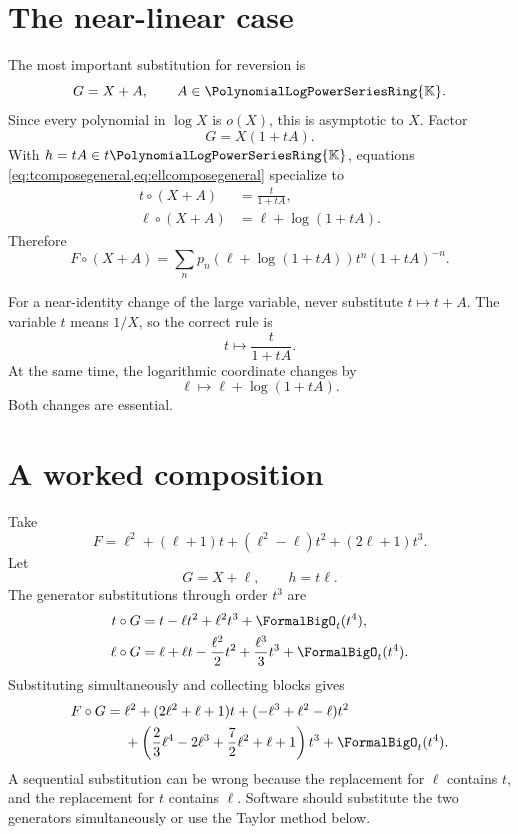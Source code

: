 \documentclass[11pt,oneside,openany]{book}
\newcommand{\K}{\mathbb{K}}
\newcommand{\Rring}{\PolynomialLogPowerSeriesRing{\K}}
\newcommand{\compose}{\mathbin{\circ}}
\begin{document}
\section{The near-linear case}
The most important substitution for reversion is
\begin{equation}\label{eq:nearlinearG}
  G=X+A,
  \qquad A\in\Rring.
\end{equation}
Since every polynomial in \(\log X\) is \(o(X)\), this is asymptotic to \(X\).
Factor
\[
 G=X(1+tA).
\]
With \(h=tA\in t\Rring\), equations
\cref{eq:tcomposegeneral,eq:ellcomposegeneral} specialize to
\begin{align}
 t\compose(X+A)&=\frac{t}{1+tA},
 \label{eq:tcomposeshift}\\
 \ell\compose(X+A)&=\ell+\log(1+tA).
 \label{eq:ellcomposeshift}
\end{align}
Therefore
\begin{equation}\label{eq:shiftcompositionexplicit}
 F\compose(X+A)
 =\sum_n p_n\!\left(\ell+\log(1+tA)\right)
   t^n(1+tA)^{-n}.
\end{equation}

\begin{keybox}
For a near-identity change of the large variable, never substitute
\(t\mapsto t+A\).  The variable \(t\) means \(1/X\), so the correct rule is
\[
  t\mapsto\frac{t}{1+tA}.
\]
At the same time, the logarithmic coordinate changes by
\[
  \ell\mapsto\ell+\log(1+tA).
\]
Both changes are essential.
\end{keybox}

\section{A worked composition}
Take
\begin{equation}\label{eq:Fcompositionexample}
 F=\ell^2+(\ell+1)t+(\ell^2-\ell)t^2+(2\ell+1)t^3.
\end{equation}
Let
\[
 G=X+\ell,
 \qquad h=t\ell.
\]
The generator substitutions through order \(t^3\) are
\begin{align*}
 t\compose G
 &=t-\ell t^2+\ell^2t^3+\FormalBigO_t(t^4),\\
 \ell\compose G
 &=\ell+\ell t-\frac{\ell^2}{2}t^2
   +\frac{\ell^3}{3}t^3+\FormalBigO_t(t^4).
\end{align*}
Substituting simultaneously and collecting blocks gives
\begin{align}\label{eq:compositionworked}
 F\compose G
 ={}&\ell^2+(2\ell^2+\ell+1)t
   +(-\ell^3+\ell^2-\ell)t^2\notag\\
 &+\left(
   \frac23\ell^4-2\ell^3+\frac72\ell^2+\ell+1
   \right)t^3+\FormalBigO_t(t^4).
\end{align}
A sequential substitution can be wrong because the replacement for \(\ell\)
contains \(t\), and the replacement for \(t\) contains \(\ell\).  Software
should substitute the two generators simultaneously or use the Taylor method
below.
\end{document}
